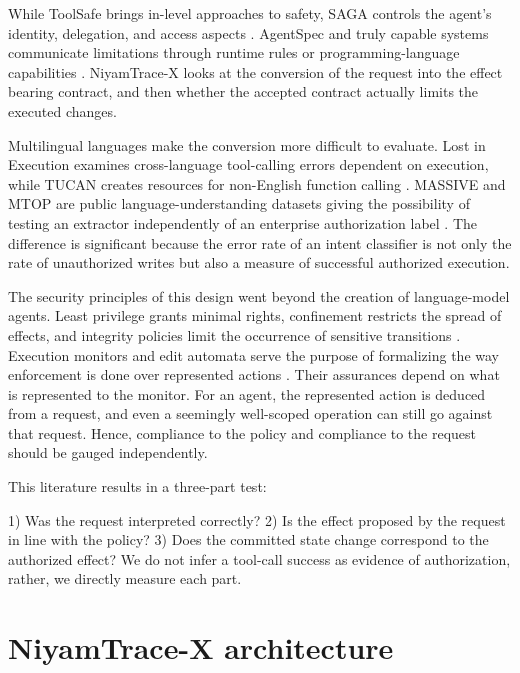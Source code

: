 \documentclass[pdflatex,sn-nature]{sn-jnl}
\begin{document}
While ToolSafe brings in-level approaches to safety, SAGA controls the agent's identity, delegation, and access aspects \cite{toolsafe2026,saga2026}. AgentSpec and truly capable systems communicate limitations through runtime rules or programming-language capabilities \cite{agentspec2026,trackedcaps2026}. NiyamTrace-X looks at the conversion of the request into the effect bearing contract, and then whether the accepted contract actually limits the executed changes.

Multilingual languages make the conversion more difficult to evaluate. Lost in Execution examines cross-language tool-calling errors dependent on execution, while TUCAN creates resources for non-English function calling \cite{lostexecution2026,tucan2026}. MASSIVE and MTOP are public language-understanding datasets giving the possibility of testing an extractor independently of an enterprise authorization label \cite{massive2023,mtop2021}. The difference is significant because the error rate of an intent classifier is not only the rate of unauthorized writes but also a measure of successful authorized execution.

The security principles of this design went beyond the creation of language-model agents. Least privilege grants minimal rights, confinement restricts the spread of effects, and integrity policies limit the occurrence of sensitive transitions \cite{saltzer1975,lampson1973,clarkwilson1987}. Execution monitors and edit automata serve the purpose of formalizing the way enforcement is done over represented actions \cite{schneider2000,ligatti2005}. Their assurances depend on what is represented to the monitor. For an agent, the represented action is deduced from a request, and even a seemingly well-scoped operation can still go against that request. Hence, compliance to the policy and compliance to the request should be gauged independently.

This literature results in a three-part test:

1) Was the request interpreted correctly? 2) Is the effect proposed by the request in line with the policy? 3) Does the committed state change correspond to the authorized effect? We do not infer a tool-call success as evidence of authorization, rather, we directly measure each part.

\section{NiyamTrace-X architecture}
\end{document}
